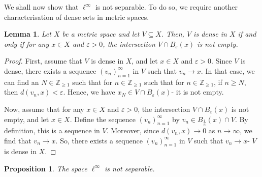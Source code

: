 \documentclass[a4paper, openany]{memoir}
\theoremstyle{definition}
\theoremstyle{plain}
\newtheorem{lemma}[definition]{Lemma}
\newtheorem{proposition}[definition]{Proposition}
\begin{document}
    We shall now show that $\ell^\infty$ is not separable. To do so, we require another characterisation of dense sets in metric spaces.
    \begin{lemma}
        Let $X$ be a metric space and let $V \subseteq X$. Then, $V$ is dense in $X$ if and only if for any $x \in X$ and $\varepsilon > 0$, the intersection $V \cap B_{\varepsilon}(x)$ is not empty.
    \end{lemma}
    \begin{proof}
        First, assume that $V$ is dense in $X$, and let $x \in X$ and $\varepsilon > 0$. Since $V$ is dense, there exists a sequence $(v_n)_{n=1}^\infty$ in $V$ such that $v_n \to x$. In that case, we can find an $N \in \mathbb{Z}_{\geq 1}$ such that for $n \in \mathbb{Z}_{\geq 1}$ such that for $n \in \mathbb{Z}_{\geq 1}$, if $n \geq N$, then $d(v_n, x) < \varepsilon$. Hence, we have $x_N \in V \cap B_{\varepsilon}(x)$- it is not empty.

        Now, assume that for any $x \in X$ and $\varepsilon > 0$, the intersection $V \cap B_{\varepsilon}(x)$ is not empty, and let $x \in X$. Define the sequence $(v_n)_{n=1}^\infty$ by $v_n \in B_{\frac{1}{n}}(x) \cap V$. By definition, this is a sequence in $V$. Moreover, since $d(v_n, x) \to 0$ as $n \to \infty$, we find that $v_n \to x$. So, there exists a sequence $(v_n)_{n=1}^\infty$ in $V$ such that $v_n \to x$- $V$ is dense in $X$.
    \end{proof}
    \begin{proposition}
        The space $\ell^\infty$ is not separable.
    \end{proposition}
\end{document}
